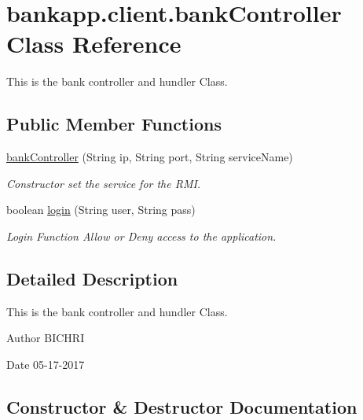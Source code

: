 \hypertarget{classbankapp_1_1client_1_1bankController}{}\section{bankapp.\+client.\+bank\+Controller Class Reference}
\label{classbankapp_1_1client_1_1bankController}


This is the bank controller and hundler Class.  


\subsection*{Public Member Functions}
\begin{DoxyCompactItemize}
\item 
\hyperlink{classbankapp_1_1client_1_1bankController_a632bf32141520837c5c06a2657a7c230}{bank\+Controller} (String ip, String port, String service\+Name)
\begin{DoxyCompactList}\small\item\em Constructor set the service for the R\+MI. \end{DoxyCompactList}\item 
boolean \hyperlink{classbankapp_1_1client_1_1bankController_aed80209fad3f3fee830107d259afb445}{login} (String user, String pass)
\begin{DoxyCompactList}\small\item\em Login Function Allow or Deny access to the application. \end{DoxyCompactList}\end{DoxyCompactItemize}


\subsection{Detailed Description}
This is the bank controller and hundler Class. 

\begin{DoxyAuthor}{Author}
B\+I\+C\+H\+RI 
\end{DoxyAuthor}
\begin{DoxyDate}{Date}
05-\/17-\/2017 
\end{DoxyDate}


\subsection{Constructor \& Destructor Documentation}
\mbox{\label{classbankapp_1_1client_1_1bankController_a632bf32141520837c5c06a2657a7c230}} 
